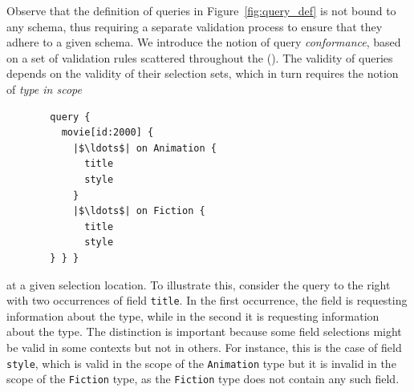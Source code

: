 Observe that the definition of queries in Figure~\ref{fig:query_def}
is not bound to any schema, thus requiring  a separate validation
process to ensure that they adhere to a given schema. We introduce the
notion of query \textit{conformance}, based on a set of validation
rules scattered throughout the \spec (\cf \cite[\S5]{gqlspec}). The
validity of queries depends on the validity of their selection sets,
which in turn requires the notion of \textit{type in scope}%
\begin{figure}
  \vspace{-1.3ex}
  \begin{flushright}
\begin{verbatim}
  query {
    movie[id:2000] {
      |$\ldots$| on Animation {
        title
        style
      }
      |$\ldots$| on Fiction {
        title
        style
  } } }
\end{verbatim}    
  \end{flushright}
\end{figure}
%
at a given selection location. %
To illustrate this, consider the query to the right with two occurrences of field \texttt{title}.
\noindent In the first occurrence, the field is requesting information about the
\animation type, while in the second it is requesting information
about the \fiction type. The distinction is important because some
field selections might be valid in some contexts but not in others. %
For instance, this is the case of field \texttt{style}, which is valid in the scope of the \texttt{Animation} type but it is invalid in the scope of the \texttt{Fiction} type, as the \texttt{Fiction} type does not contain any such field. %

